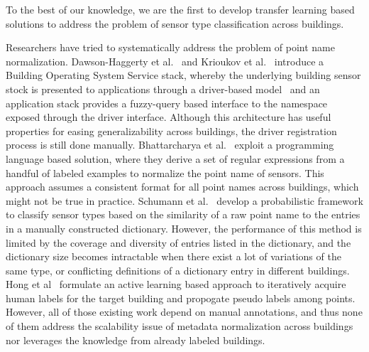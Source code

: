To the best of our knowledge, we are the first to develop transfer learning based solutions to address the problem of sensor type classification across buildings.

Researchers have tried to systematically address the problem of point name normalization.
Dawson-Haggerty et al.~\cite{boss} and Krioukov et al.~\cite{bas}
introduce a Building Operating System Service stack, whereby
the underlying building sensor stock is presented to applications through a driver-based model \
and an application stack provides a fuzzy-query based interface to the namespace exposed
through the driver interface.
Although this architecture has useful properties for easing generalizability across
buildings, the driver registration process is still done manually.
Bhattarcharya et al.~\cite{arka} exploit a programming language based solution,
where they derive a set of regular expressions from a handful of labeled examples
to normalize the point name of sensors.
This approach assumes a consistent format for all point names across buildings, which might not be true in practice.
Schumann et al.~\cite{ibm} develop a probabilistic framework to classify sensor types
based on the similarity of a raw point name to the entries in a manually constructed dictionary.
However, the performance of this method is limited by the coverage and diversity of entries listed in the dictionary, and the dictionary size becomes intractable when there exist a lot of variations of the same type, or conflicting definitions of a dictionary entry in different buildings.
Hong et al~\cite{cikm} formulate an active learning based approach to iteratively
acquire human labels for the target building and propogate pseudo labels among points.
However, all of those existing work depend on manual annotations, and thus none of them address the scalability issue of metadata
normalization across buildings nor leverages the knowledge from already labeled buildings.

